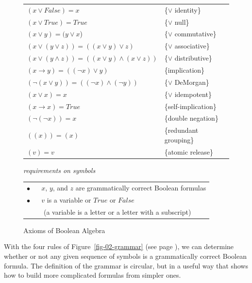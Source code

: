 \begin{figure}
\begin{center}
\begin{tabular}{ll}
$(x \vee False) = x$                                     & \{$\vee$ identity\} \\
$(x \vee True) = True$                                   & \{$\vee$ null\} \\
$(x \vee y) = (y \vee x$)                                & \{$\vee$ commutative\} \\
$(x \vee (y \vee z)) = ((x \vee y) \vee z)$              & \{$\vee$ associative\} \\
$(x \vee (y \wedge z)) = ((x \vee y) \wedge (x \vee z))$ & \{$\vee$ distributive\} \\
$(x \rightarrow y) = ((\neg x) \vee y)$                  & \{implication\} \\
$(\neg(x \vee y)) = ((\neg x) \wedge (\neg y))$          & \{$\vee$ DeMorgan\} \\
$(x \vee x) = x$                                         & \{$\vee$ idempotent\} \\
$(x \rightarrow x) = True$                               & \{self-implication\} \\
$(\neg(\neg x))  = x$                                    & \{double negation\} \\
$((x)) = (x)$                                            & \{redundant grouping\} \\
$(v) = v$                                                & \{atomic release\} \\
\end{tabular}

\vspace{2 mm}

\emph{requirements on symbols}

\begin{tabular}{l}
\hline
$\bullet$ ~~ $x$, $y$, and $z$ are grammatically correct Boolean formulas \\
$\bullet$ ~~ $v$ is a variable or $True$ or $False$ \\
~~~~~(a variable is a letter or a letter with a subscript) \\
\hline
\end{tabular}
\end{center}
\caption{Axioms of Boolean Algebra}
\label{fig-02-boolean-axioms}
\end{figure}

With the four rules of Figure~\ref{fig-02-grammar} (see page \pageref{fig-02-grammar}),
we can determine whether or not any given sequence of symbols is a grammatically correct Boolean formula.
The definition of the grammar is circular, but in a useful way that shows how to build more complicated formulas from simpler ones.

